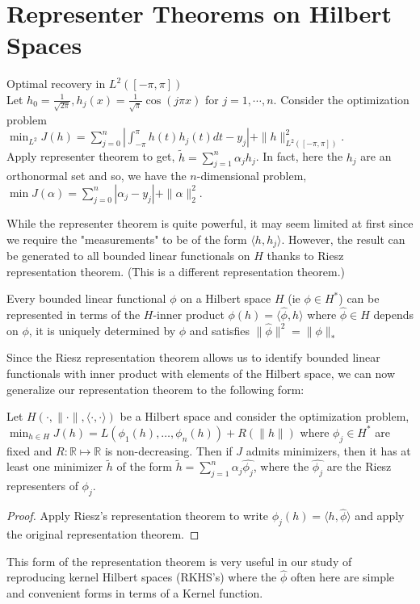 \documentclass[11pt]{book} %
\begin{document}
\chapter{Representer Theorems on Hilbert Spaces}
\begin{example}
    Optimal recovery in $L^2([-\pi, \pi])$\\
    Let $h_0=\frac{1}{\sqrt{2\pi}}, h_j(x)=\frac{1}{\sqrt{\pi}}\cos(j\pi x)$ for $j=1,\cdots,n$. Consider the optimization problem \\
    $\min_{L^2} J(h)= \sum\limits_{j=0}^{n}|\int_{-\pi}^{\pi}h(t)h_j(t)dt-y_j|+\|h\|^2_{L^2([-\pi,\pi])}$. \\
    Apply representer theorem to get, $\tilde{h}=\sum\limits_{j=1}^n\alpha_jh_j$. In fact, here the $h_j$ are an orthonormal set and so, we have the $n$-dimensional problem, 
    $\min J(\alpha)=\sum\limits_{j=0}^n|\alpha_j-y_j|+\|\alpha\|^2_2$.\\
\end{example}
While the representer theorem is quite powerful, it may seem limited at first since we require the "measurements" to be of the form $\langle h,h_j\rangle$. However, the result can be generated to all bounded linear functionals on $H$ thanks to Riesz representation theorem. (This is a different representation theorem.)\\
\begin{theorem}
    Every bounded linear functional $\phi$ on a Hilbert space $H$ (ie $\phi\in H^*$) can be represented in terms of the $H$-inner product $\phi(h)=\langle\hat{\phi},h\rangle$ where $\hat\phi\in H$ depends on $\phi$, it is uniquely determined by $\phi$ and satisfies $\|\hat{\phi}\|^2=\|\phi\|_*$
\end{theorem}
Since the Riesz representation theorem allows us to identify bounded linear functionals with inner product with elements of the Hilbert space, we can now generalize our representation theorem to the following form:\\
\begin{theorem}
    Let $H(\cdot, \|\cdot\|, \langle\cdot,\cdot\rangle)$ be a Hilbert space and consider the optimization problem,\\
    $\min_{h\in H} J(h)=L(\phi_1(h),\dots,\phi_n(h))+R(\|h\|)$
    where $\phi_j\in H^*$ are fixed and $R:\mathbb{R}\mapsto\mathbb{R}$ is non-decreasing. Then if $J$ admits minimizers, then it has at least one minimizer $\tilde{h}$ of the form $\tilde{h}=\sum\limits_{j=1}^{n}\alpha_j\hat{\phi_j}$, where the $\hat{\phi_j}$ are the Riesz representers of $\phi_j$.
\end{theorem}
\begin{proof}
    Apply Riesz's representation theorem to write $\phi_j(h)=\langle  h,\hat{\phi}\rangle$ and apply the original representation theorem. 
\end{proof}
This form of the representation theorem is very useful in our study of reproducing kernel Hilbert spaces (RKHS's) where the $\hat{\phi}$ often here are simple and convenient forms in terms of a Kernel function.\\
\end{document}
